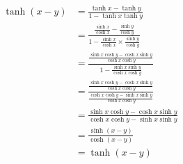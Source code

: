 \documentclass[12pt]{article}
\begin{document}
\begin{enumerate}
\begin{equation*}
  \begin{aligned}
  \tanh(x-y)&=\frac{\tanh{x}-\tanh{y}}{1-\tanh{x}\tanh{y}}\\
  &=\frac{\frac{\sinh{x}}{\cosh{x}}-\frac{\sinh{y}}{\cosh{y}}}{1-\frac{\sinh{x}}{\cosh{x}}\times\frac{\sinh{y}}{\cosh{y}}}\\
  &=\frac{\frac{\sinh{x}\cosh{y}-\cosh{x}\sinh{y}}{\cosh{x}\cosh{y}}}{1-\frac{\sinh{x}\sinh{y}}{\cosh{x}\cosh{y}}}\\
  &=\frac{\frac{\sinh{x}\cosh{y}-\cosh{x}\sinh{y}}{\cosh{x}\cosh{y}}}{\frac{\cosh{x}\cosh{y}-\sinh{x}\sinh{y}}{\cosh{x}\cosh{y}}}\\
  &=\frac{\sinh{x}\cosh{y}-\cosh{x}\sinh{y}}{\cosh{x}\cosh{y}-\sinh{x}\sinh{y}}\\
  &=\frac{\sinh(x-y)}{\cosh(x-y)}\\
  &=\tanh(x-y)
  \end{aligned}
\end{equation*}
\end{enumerate}
\end{document}
